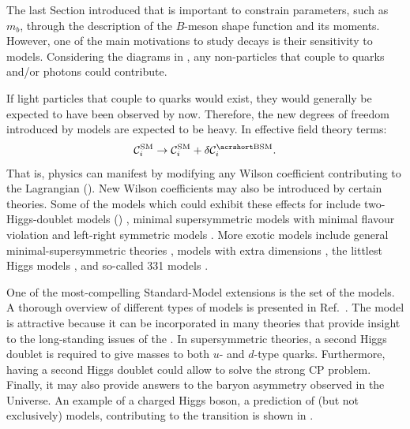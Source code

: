 The last Section introduced that \BtoXsgamma is important to constrain \SM parameters, 
such as $m_b$, through the description of the $B$-meson shape function and its moments.
However, one of the main motivations to study \BtoXsgamma decays is their sensitivity to \BSM models.
Considering the \SM diagrams in , any non-\SM particles that couple to quarks and/or photons could contribute.

If light particles that couple to quarks would exist, they would generally be expected to have been observed by now.
Therefore, the new degrees of freedom introduced by \BSM models are expected to be heavy.
In effective field theory terms:
\begin{equation}\label{eq:corr_wilson}
    \mathcal{C}_i^{\mathrm{SM}} \ra \mathcal{C}_i^{\mathrm{SM}} + \delta\mathcal{C}_i^{\mathrm{\BSM}}.
\end{equation}
That is, \BSM physics can manifest by modifying any Wilson coefficient contributing to the \btosgamma Lagrangian ().
New Wilson coefficients may also be introduced by certain theories.
Some of the models which could exhibit these effects for \BtoXsgamma include 
two-Higgs-doublet models (\TwoHDM) \cite{Borzumati:1998tg,Bobeth:1999ww,Hermann:2012fc}, 
minimal supersymmetric models with minimal flavour violation \cite{Bobeth:1999ww,Borzumati:2003rr,Degrassi:2006eh,Freitas:2007dp}
and left-right symmetric models \cite{Bobeth:1999ww}.
More exotic models include 
general minimal-supersymmetric theories \cite{Ciuchini:2007ha},
models with extra dimensions \cite{Buras:2003mk,Agashe:2004cp,Haisch:2007vb,Freitas:2008vh},
the littlest Higgs models \cite{Buras:2006wk,Blanke:2006sb},
and so-called 331 models \cite{Promberger:2008xg}.

One of the most-compelling Standard-Model extensions is the set of the \TwoHDM models.
A thorough overview of different types of \TwoHDM models is presented in Ref.~\cite{Branco:2011iw}.
The model is attractive because it can be incorporated in many theories that provide insight to the long-standing issues of the \SM.
In supersymmetric theories, a second Higgs doublet is required to give masses to both $u$- and $d$-type quarks.
Furthermore, having a second Higgs doublet could allow to solve the strong CP problem.
Finally, it may also provide answers to the baryon asymmetry observed in the Universe.
An example of a charged Higgs boson, a prediction of (but not exclusively) \TwoHDM models, contributing to the \btosgamma transition is shown in .

